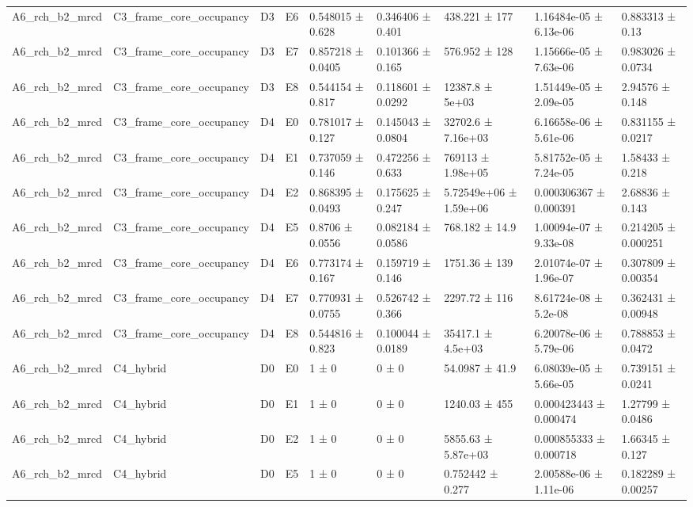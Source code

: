 \begin{table}
\begin{tabular}{lllllllll}
A6\_rch\_b2\_mrcd & C3\_frame\_core\_occupancy & D3 & E6 & 0.548015 ± 0.628 & 0.346406 ± 0.401 & 438.221 ± 177 & 1.16484e-05 ± 6.13e-06 & 0.883313 ± 0.13 \\
A6\_rch\_b2\_mrcd & C3\_frame\_core\_occupancy & D3 & E7 & 0.857218 ± 0.0405 & 0.101366 ± 0.165 & 576.952 ± 128 & 1.15666e-05 ± 7.63e-06 & 0.983026 ± 0.0734 \\
A6\_rch\_b2\_mrcd & C3\_frame\_core\_occupancy & D3 & E8 & 0.544154 ± 0.817 & 0.118601 ± 0.0292 & 12387.8 ± 5e+03 & 1.51449e-05 ± 2.09e-05 & 2.94576 ± 0.148 \\
A6\_rch\_b2\_mrcd & C3\_frame\_core\_occupancy & D4 & E0 & 0.781017 ± 0.127 & 0.145043 ± 0.0804 & 32702.6 ± 7.16e+03 & 6.16658e-06 ± 5.61e-06 & 0.831155 ± 0.0217 \\
A6\_rch\_b2\_mrcd & C3\_frame\_core\_occupancy & D4 & E1 & 0.737059 ± 0.146 & 0.472256 ± 0.633 & 769113 ± 1.98e+05 & 5.81752e-05 ± 7.24e-05 & 1.58433 ± 0.218 \\
A6\_rch\_b2\_mrcd & C3\_frame\_core\_occupancy & D4 & E2 & 0.868395 ± 0.0493 & 0.175625 ± 0.247 & 5.72549e+06 ± 1.59e+06 & 0.000306367 ± 0.000391 & 2.68836 ± 0.143 \\
A6\_rch\_b2\_mrcd & C3\_frame\_core\_occupancy & D4 & E5 & 0.8706 ± 0.0556 & 0.082184 ± 0.0586 & 768.182 ± 14.9 & 1.00094e-07 ± 9.33e-08 & 0.214205 ± 0.000251 \\
A6\_rch\_b2\_mrcd & C3\_frame\_core\_occupancy & D4 & E6 & 0.773174 ± 0.167 & 0.159719 ± 0.146 & 1751.36 ± 139 & 2.01074e-07 ± 1.96e-07 & 0.307809 ± 0.00354 \\
A6\_rch\_b2\_mrcd & C3\_frame\_core\_occupancy & D4 & E7 & 0.770931 ± 0.0755 & 0.526742 ± 0.366 & 2297.72 ± 116 & 8.61724e-08 ± 5.2e-08 & 0.362431 ± 0.00948 \\
A6\_rch\_b2\_mrcd & C3\_frame\_core\_occupancy & D4 & E8 & 0.544816 ± 0.823 & 0.100044 ± 0.0189 & 35417.1 ± 4.5e+03 & 6.20078e-06 ± 5.79e-06 & 0.788853 ± 0.0472 \\
A6\_rch\_b2\_mrcd & C4\_hybrid & D0 & E0 & 1 ± 0 & 0 ± 0 & 54.0987 ± 41.9 & 6.08039e-05 ± 5.66e-05 & 0.739151 ± 0.0241 \\
A6\_rch\_b2\_mrcd & C4\_hybrid & D0 & E1 & 1 ± 0 & 0 ± 0 & 1240.03 ± 455 & 0.000423443 ± 0.000474 & 1.27799 ± 0.0486 \\
A6\_rch\_b2\_mrcd & C4\_hybrid & D0 & E2 & 1 ± 0 & 0 ± 0 & 5855.63 ± 5.87e+03 & 0.000855333 ± 0.000718 & 1.66345 ± 0.127 \\
A6\_rch\_b2\_mrcd & C4\_hybrid & D0 & E5 & 1 ± 0 & 0 ± 0 & 0.752442 ± 0.277 & 2.00588e-06 ± 1.11e-06 & 0.182289 ± 0.00257 \\

\end{tabular}
\end{table}
